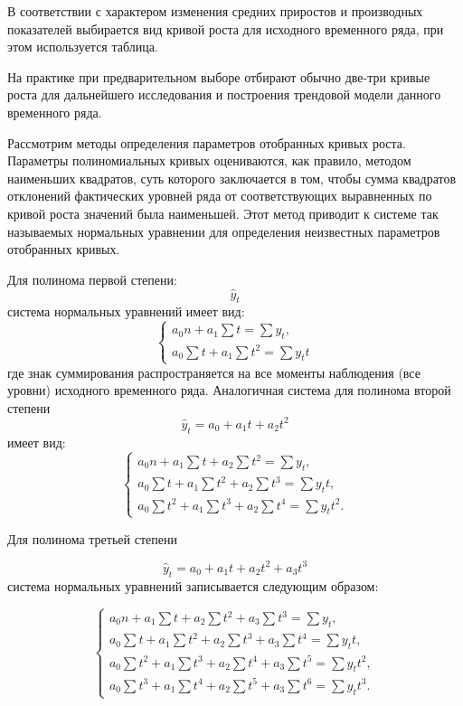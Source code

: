 В соответствии с характером изменения средних приростов и производных показателей выбирается вид кривой роста для исходного временного ряда, при этом используется таблица.





На практике при предварительном выборе отбирают обычно две-три кривые роста для дальнейшего исследования и построения трендовой модели данного временного ряда.

Рассмотрим методы определения параметров отобранных кривых роста. Параметры полиномиальных кривых оцениваются, как правило, методом наименьших квадратов, суть которого заключается в том, чтобы сумма квадратов отклонений фактических уровней ряда от соответствующих выравненных по кривой роста значений была наименьшей. Этот метод приводит к системе так называемых нормальных уравнении для определения неизвестных параметров отобранных кривых.

Для полинома первой степени:
\[ \hat{y}_t \]
система нормальных уравнений имеет вид:
\[ 
	\left\{
			\begin{array}{ll}
										a_0n + a_1\sum t = \sum y_t,  \\ 
										a_0\sum t + a_1\sum t^2 = \sum y_tt 
			\end{array} \right. \]
где знак суммирования распространяется на все моменты наблюдения (все уровни) исходного временного ряда. Аналогичная система для полинома второй степени
\[ \hat{y}_t = a_0 + a_1t +a_2t^2  \]
имеет вид:
\[ 
	\left\{
		\begin{array}{ll}
				a_0n + a_1\sum t +a_2 \sum t^2 = \sum y_t, \\ 
				a_0\sum t + a_1\sum t^2 + a_2 \sum t^3 = \sum y_tt, \\
				a_0 \sum t^2 + a_1\sum t^3 + a_2 \sum t^4 = \sum y_t t^2.
		\end{array} \right. 
\]

Для полинома третьей степени

\[ \hat{y}_t = a_0 + a_1t +a_2t^2 + a_3t^3 \]
система нормальных уравнений записывается следующим образом:

\[ 
	\left\{
		\begin{array}{ll}
			a_0n + a_1\sum t +a_2 \sum t^2 + a_3\sum t^3 = \sum y_t, \\ 
			a_0\sum t + a_1\sum t^2 + a_2 \sum t^3 + a_3\sum t^4= \sum y_tt, \\
			a_0 \sum t^2 + a_1\sum t^3 + a_2 \sum t^4 + a_3\sum t^5 = \sum y_t t^2, \\
			a_0 \sum t^3 + a_1\sum t^4 + a_2 \sum t^5 + a_3\sum t^6= \sum y_t t^3.
		\end{array}\right. 
\]

